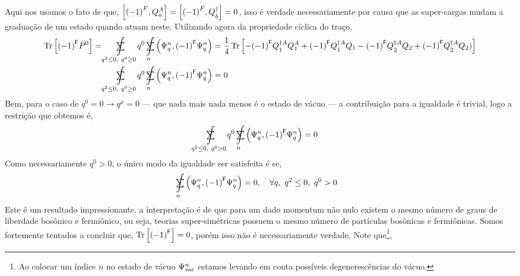 Aqui nos usamos o fato de que, $\comm{\qty(-1)^F}{Q^A_a}=\comm{\qty(-1)^F}{Q^{\dagger}_{\dot b}}=0$, isso é verdade 
necessariamente por causa que as super-cargas mudam a graduação de um estado quando atuam neste. Utilizando agora da 
propriedade cíclica do traço,
\begin{align*}
    \Tr\qty[\qty(-1)^{\mathsf F}P^0]=\ \ \ \ \ \ \mathclap{\displaystyle\int\limits_{q^2\leq 0,\ q^0\geq 0}}\mathclap{\textstyle\sum}\ \ \ \ \ \ q^0\ \ \mathclap{\displaystyle\int\limits_n}\mathclap{\textstyle\sum}\ \ \qty(\Psi^n_q,\qty(-1)^{\mathsf F} \Psi^n_q)&=\frac14\Tr\qty[-\qty(-1)^{\mathsf F}Q^{\dagger A}_{\dot 1}Q_1^A+\qty(-1)^{\mathsf F}Q^{\dagger A}_{\dot 1}Q_1-\qty(-1)^{\mathsf F}Q^{\dagger A}_{\dot 2}Q_2+\qty(-1)^{\mathsf F}Q^{\dagger A}_{\dot 2}Q_2)]\\
    \ \ \ \ \ \ \mathclap{\displaystyle\int\limits_{q^2\leq 0,\ q^0\geq 0}}\mathclap{\textstyle\sum}\ \ \ \ \ \ q^0\ \ \mathclap{\displaystyle\int\limits_n}\mathclap{\textstyle\sum}\ \ \qty(\Psi^n_q,\qty(-1)^{\mathsf F} \Psi^n_q)&=0
\end{align*}
Bem, para o caso de $q^0=0\rightarrow q^\mu=0$ --- que nada mais nada menos é o estado de vácuo --- a contribuição para a igualdade é trivial, logo a restrição que obtemos é,
\begin{align*}
    \ \ \ \ \ \ \mathclap{\displaystyle\int\limits_{q^2\leq 0,\ q^0> 0}}\mathclap{\textstyle\sum}\ \ \ \ \ \ q^0\ \ \mathclap{\displaystyle\int\limits_n}\mathclap{\textstyle\sum}\ \ \qty(\Psi^n_q,\qty(-1)^{\mathsf F} \Psi^n_q)&=0
\end{align*}
Como necessariamente $q^0>0$, o único modo da igualdade ser satisfeita é se,
\begin{align*}
    \ \ \mathclap{\displaystyle\int\limits_n}\mathclap{\textstyle\sum}\ \ \qty(\Psi^n_q,\qty(-1)^{\mathsf F} \Psi^n_q)&=0,\ \ \ \forall q,\ q^2\leq 0,\ q^0>0
\end{align*}
Este é um resultado impressionante, a interpretação é de que para um dado momentum não nulo existem o mesmo número de 
graus de liberdade bosônico e fermiônico, ou seja, teorias super-simétricas possuem o mesmo número de partículas bosônicas 
e fermiônicas. Somos fortemente tentados a concluir que, $\Tr\qty[\qty(-1)^{\mathsf F}]=0$, porém isso não é necessariamente 
verdade. Note que\footnote{Ao colocar um índice $n$ no estado de vácuo $\Psi_{\textnormal{vac}}^n$ estamos levando em conta possíveis degenerescências do vácuo.},

